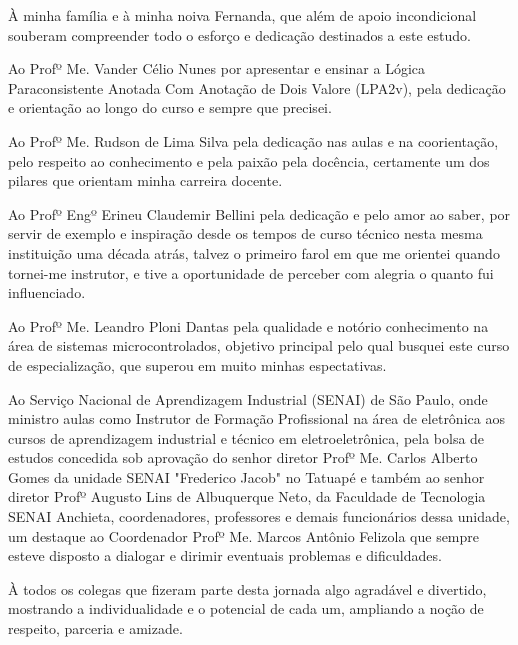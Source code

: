 À minha família e à minha noiva Fernanda, que além de apoio incondicional souberam compreender todo o esforço e dedicação destinados a este estudo.

Ao Profº Me. Vander Célio Nunes por apresentar e ensinar a Lógica Paraconsistente Anotada Com Anotação de Dois Valore (LPA2v), pela dedicação e orientação ao longo do curso e sempre que precisei.

Ao Profº Me. Rudson de Lima Silva pela dedicação nas aulas e na coorientação, pelo respeito ao conhecimento e pela paixão pela docência, certamente um dos pilares que orientam minha carreira docente.

Ao Profº Engº Erineu Claudemir Bellini pela dedicação e pelo amor ao saber, por servir de exemplo e inspiração desde os tempos de curso técnico nesta mesma instituição uma década atrás, talvez o primeiro farol em que me orientei quando tornei-me instrutor, e tive a oportunidade de perceber com alegria o quanto fui influenciado. 

Ao Profº Me. Leandro Ploni Dantas pela qualidade e notório conhecimento na área de sistemas microcontrolados, objetivo principal pelo qual busquei este curso de especialização, que superou em muito minhas espectativas.

Ao Serviço Nacional de Aprendizagem Industrial (SENAI) de São Paulo, onde ministro aulas como Instrutor de Formação Profissional na área de eletrônica aos cursos de aprendizagem industrial e técnico em eletroeletrônica, pela bolsa de estudos concedida sob aprovação do senhor diretor Profº Me. Carlos Alberto Gomes da unidade SENAI "Frederico Jacob" no Tatuapé e também ao senhor diretor Profº Augusto Lins de Albuquerque Neto, da Faculdade de Tecnologia SENAI Anchieta, coordenadores, professores e demais funcionários dessa unidade, um destaque ao Coordenador Profº Me. Marcos Antônio Felizola que sempre esteve disposto a dialogar e dirimir eventuais problemas e dificuldades.

À todos os colegas que fizeram parte desta jornada algo agradável e divertido, mostrando a individualidade e o potencial de cada um, ampliando a noção de respeito, parceria e amizade. 

 
